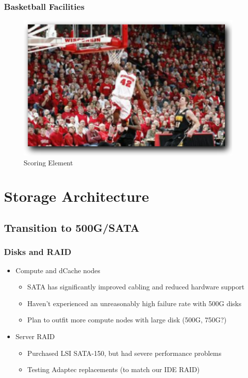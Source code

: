 \documentclass{beamer}
\begin{document}
\begin{frame}
\frametitle{Basketball Facilities}
\begin{figure}
    \includegraphics*{Graphics/tucker.png}
    \caption{Scoring Element}
\end{figure}
\end{frame}

\section{Storage Architecture}
\subsection{Transition to 500G/SATA}
\begin{frame}
\frametitle{Disks and RAID}
\begin{itemize}
    \item Compute and dCache nodes
    \begin{itemize}
        \item SATA has significantly improved cabling and reduced hardware 
        support
        \item Haven't experienced an unreasonably high failure rate with 500G disks
        \item Plan to outfit more compute nodes with large disk (500G, 750G?)
    \end{itemize}
    \item Server RAID
    \begin{itemize}
        \item Purchased LSI SATA-150, but had severe performance problems
        \item Testing Adaptec replacements (to match our IDE RAID)
    \end{itemize}
\end{itemize}
\end{frame}
\end{document}

